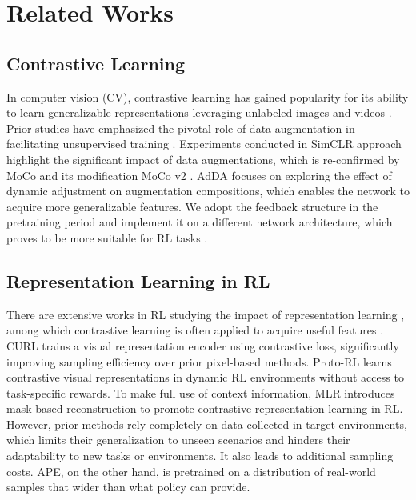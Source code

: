 \section{Related Works}
\subsection{Contrastive Learning}
In computer vision (CV), contrastive learning has gained popularity for its ability to learn generalizable representations leveraging unlabeled images and videos \cite{Oord2018RepresentationLW, SimCLR, MoCo}. Prior studies have emphasized the pivotal role of data augmentation in facilitating unsupervised training \cite{res7, res8, res9}.
Experiments conducted in SimCLR approach \cite{SimCLR} highlight the significant impact of data augmentations, which is re-confirmed by MoCo \cite{MoCo} and its modification MoCo v2 \cite{mocov2}.
AdDA \cite{Zhang2023AdaptiveDA} focuses on exploring the effect of dynamic adjustment on augmentation compositions, which enables the network to acquire more generalizable features. 
We adopt the feedback structure \cite{Zhang2023AdaptiveDA}  in the pretraining period and implement it on a different network architecture, which proves to be more suitable for RL tasks \cite{Yuan2022PreTrainedIE}.




\subsection{Representation Learning in RL}
There are extensive works in RL studying the impact of representation learning \cite{ Lin2020LearningTS, Liu2023RobustRL}, among which contrastive learning is often applied to acquire useful features \cite{Zhan2020LearningVR, Du2021CuriousRL, Schwarzer2021PretrainingRF}. CURL \cite{CURL} trains a visual representation encoder using contrastive loss, significantly improving sampling efficiency over prior pixel-based methods. Proto-RL \cite{Yarats2021ReinforcementLW} learns contrastive visual representations in dynamic RL environments without access to task-specific rewards. To make full use of context information, MLR \cite{Yu2022MaskbasedLR} introduces mask-based reconstruction to promote contrastive representation learning in RL. 
However, prior methods rely completely on data collected in target environments, which limits their generalization to unseen scenarios and hinders their adaptability to new tasks or environments. It also leads to additional sampling costs. APE, on the other hand, is pretrained on a distribution of real-world samples that wider than what policy can provide. 

